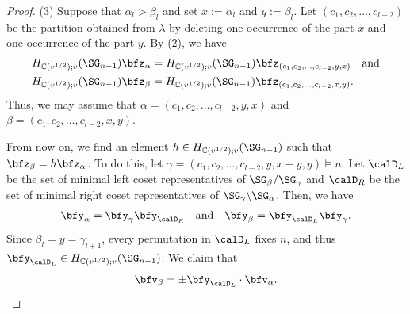 \documentclass[12pt, reqno]{amsart}
\theoremstyle{plain}
\theoremstyle{definition}
\numberwithin{equation}{section}
\numberwithin{figure}{section}
\numberwithin{table}{section}
\def\C{\mathbb C}
\begin{document}
\begin{proof}
(3) 
Suppose that $\alpha_l > \beta_l$ and set $x := \alpha_l$ and $y := \beta_l$.
Let $(c_1, c_2, \ldots, c_{l-2})$ be the partition obtained from $\lambda$ by deleting one occurrence of the part $x$ and one occurrence of the part $y$.
By (2), we have 
\begin{align*}
& H_{\C(v^{1/2});v}(\SG_{n-1})\bfz_{\alpha} = H_{\C(v^{1/2});v}(\SG_{n-1})\bfz_{(c_1, c_2, \ldots, c_{l-2}, y,x)}\quad\text{and}\\
& H_{\C(v^{1/2});v}(\SG_{n-1})\bfz_{\beta} = H_{\C(v^{1/2});v}(\SG_{n-1})\bfz_{(c_1, c_2, \ldots, c_{l-2}, x,y)}.
\end{align*}
Thus, we may assume that $\alpha = (c_1, c_2, \ldots, c_{l-2}, y,x)$ and $\beta = (c_1, c_2, \ldots, c_{l-2}, x,y)$.


From now on, we find an element $h \in H_{\C(v^{1/2});v}(\SG_{n-1})$ such that $\bfz_{\beta} = h\bfz_{\alpha}$.
To do this, let $\gamma = (c_1, c_2, \ldots, c_{l-2}, y, x - y, y) \models n$.
Let $\calD_L$ be the set of minimal left coset representatives of $\SG_\beta/\SG_\gamma$ and $\calD_R$ be the set of minimal right coset representatives of $\SG_\gamma\backslash\SG_\alpha$.
Then, we have
\begin{align}\label{eq: alpha beta gamma decomp}
\bfy_{\alpha} = \bfy_\gamma \bfy_{\calD_R} \quad \text{and} \quad \bfy_\beta = \bfy_{\calD_L}  \bfy_\gamma.
\end{align}
Since $\beta_l = y = \gamma_{l+1}$, every permutation in $\calD_L$ fixes $n$, and thus  $\bfy_{\calD_L} \in H_{\C( v^{1/2});v}(\SG_{n-1})$.
We claim that 
\begin{align}\label{eq: y v al equal v be}
\bfv_\beta = \pm \bfy_{\calD_L} \cdot \bfv_\alpha.
\end{align}


\end{proof}
\end{document}
